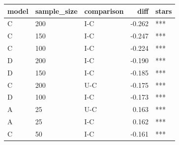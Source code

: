 
\begin{tabular}{lllrl}
\toprule
model & sample\_size & comparison & diff & stars\\
\midrule
C & 200 & I-C & -0.262 & ***\\
C & 150 & I-C & -0.247 & ***\\
C & 100 & I-C & -0.224 & ***\\
D & 200 & I-C & -0.190 & ***\\
D & 150 & I-C & -0.185 & ***\\
\addlinespace
C & 200 & U-C & -0.175 & ***\\
D & 100 & I-C & -0.173 & ***\\
A & 25 & U-C & 0.163 & ***\\
A & 25 & I-C & 0.162 & ***\\
C & 50 & I-C & -0.161 & ***\\
\bottomrule
\end{tabular}
